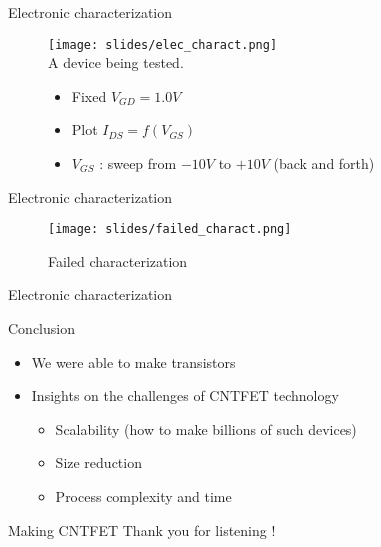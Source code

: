 \documentclass{beamer}
\begin{document}
\begin{frame}{Electronic characterization}
    \begin{figure}
        \centering
        \texttt{[image: slides/elec\_charact.png]}
        \\
        A device being tested.

        \begin{itemize}
        \item Fixed $V_{GD} = 1.0V$
            \item Plot $I_{DS} = f(V_{GS})$
            \item $V_{GS}$ : sweep from $-10V$ to $+10V$ (back and forth)
        \end{itemize}
    \end{figure}
\end{frame}

\begin{frame}{Electronic characterization}
    \begin{figure}
        \centering
        \texttt{[image: slides/failed\_charact.png]}
        \caption{Failed characterization}
        \label{fig:enter-label}
    \end{figure}
\end{frame}

\begin{frame}{Electronic characterization}
    \begin{figure}[h]
        \centering
    \end{figure}
\end{frame}
\begin{frame}{Conclusion}
    \begin{itemize}
        \item We were able to make transistors
        \item Insights on the challenges of CNTFET technology
        \begin{itemize}
            \item Scalability (how to make billions of such devices)
            \item Size reduction
            \item Process complexity and time
        \end{itemize}
    \end{itemize}
    
\end{frame}

\begin{frame}{Making CNTFET}
    \centering Thank you for listening !
    
    \begin{figure}[h]
    \end{figure}
\end{frame}
\end{document}
